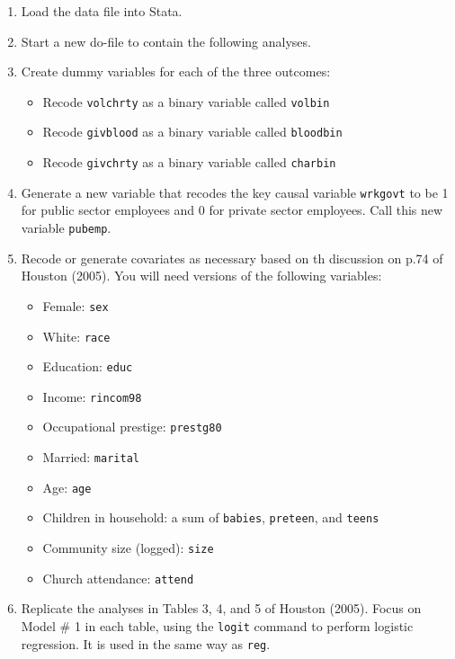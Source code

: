 \documentclass[a4paper,12pt]{article}
\begin{document}
\begin{enumerate}\itemsep1em
\item Load the data file into Stata.

\item Start a new do-file to contain the following analyses.

\item Create dummy variables for each of the three outcomes:

	\begin{itemize}
	\item Recode \texttt{volchrty} as a binary variable called \texttt{volbin} 
	\item Recode \texttt{givblood} as a binary variable called \texttt{bloodbin}
	\item Recode \texttt{givchrty} as a binary variable called \texttt{charbin}
	\end{itemize}

\item Generate a new variable that recodes the key causal variable \texttt{wrkgovt} to be 1 for public sector employees and 0 for private sector employees. Call this new variable \texttt{pubemp}.

\item Recode or generate covariates as necessary based on th discussion on p.74 of Houston (2005). You will need versions of the following variables:

	\begin{itemize}
	\item Female: \texttt{sex}
	\item White: \texttt{race}
	\item Education: \texttt{educ}
	\item Income: \texttt{rincom98}
	\item Occupational prestige: \texttt{prestg80}
	\item Married: \texttt{marital}
	\item Age: \texttt{age}
	\item Children in household: a sum of \texttt{babies}, \texttt{preteen}, and \texttt{teens}
	\item Community size (logged): \texttt{size}
	\item Church attendance: \texttt{attend}
	\end{itemize}

\item Replicate the analyses in Tables 3, 4, and 5 of Houston (2005). Focus on Model \# 1 in each table, using the \texttt{logit} command to perform logistic regression. It is used in the same way as \texttt{reg}.


\end{enumerate}
\end{document}
